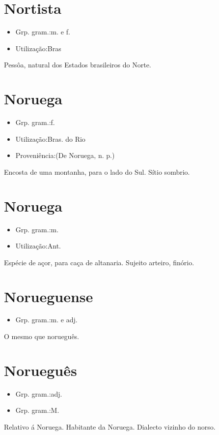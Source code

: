 \section{Nortista}
\begin{itemize}
\item {Grp. gram.:m.  e  f.}
\end{itemize}
\begin{itemize}
\item {Utilização:Bras}
\end{itemize}
Pessôa, natural dos Estados brasileiros do Norte.
\section{Noruega}
\begin{itemize}
\item {Grp. gram.:f.}
\end{itemize}
\begin{itemize}
\item {Utilização:Bras. do Rio}
\end{itemize}
\begin{itemize}
\item {Proveniência:(De \textunderscore Noruega\textunderscore , n. p.)}
\end{itemize}
Encosta de uma montanha, para o lado do Sul.
Sítio sombrio.
\section{Noruega}
\begin{itemize}
\item {Grp. gram.:m.}
\end{itemize}
\begin{itemize}
\item {Utilização:Ant.}
\end{itemize}
Espécie de açor, para caça de altanaria.
Sujeito arteiro, finório.
\section{Norueguense}
\begin{itemize}
\item {Grp. gram.:m.  e  adj.}
\end{itemize}
O mesmo que \textunderscore norueguês\textunderscore .
\section{Norueguês}
\begin{itemize}
\item {Grp. gram.:adj.}
\end{itemize}
\begin{itemize}
\item {Grp. gram.:M.}
\end{itemize}
Relativo á Noruega.
Habitante da Noruega.
Dialecto vizinho do norso.
